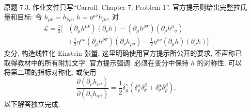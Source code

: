 \begin{exercise}
原题 7.3. 作业文件只写“Carroll: Chapter 7, Problem 1”. 官方提示则给出完整拉氏量和目标: 令 $h_{\mu\nu}=h_{\nu\mu}$, $h=\eta^{\mu\nu}h_{\mu\nu}$, 对
\begin{align*}
\mathcal L=\frac12\biggl[&
(\partial_\mu h^{\mu\nu})(\partial_\nu h)
-(\partial_\mu h^{\rho\sigma})(\partial_\rho h^\mu{}_{\sigma})\\
&+\frac12\eta^{\mu\nu}(\partial_\mu h^{\rho\sigma})(\partial_\nu h_{\rho\sigma})
-\frac12\eta^{\mu\nu}(\partial_\mu h)(\partial_\nu h)\biggr]
\end{align*}
变分, 构造线性化 Einstein 张量. 这里明确使用官方提示所公开的要求, 不声称已取得教材中的所有附加文字. 官方提示强调: 必须在变分中保持 $h$ 的对称性; 可以将第二项的指标对称化, 或使用
\[
\frac{\partial(\partial_\mu h_{\rho\sigma})}{\partial(\partial_\gamma h_{\alpha\beta})}
=\frac12\delta^\gamma_\mu
(\delta^\alpha_\rho\delta^\beta_\sigma+\delta^\alpha_\sigma\delta^\beta_\rho).
\]
以下解答独立完成.
\end{exercise}
